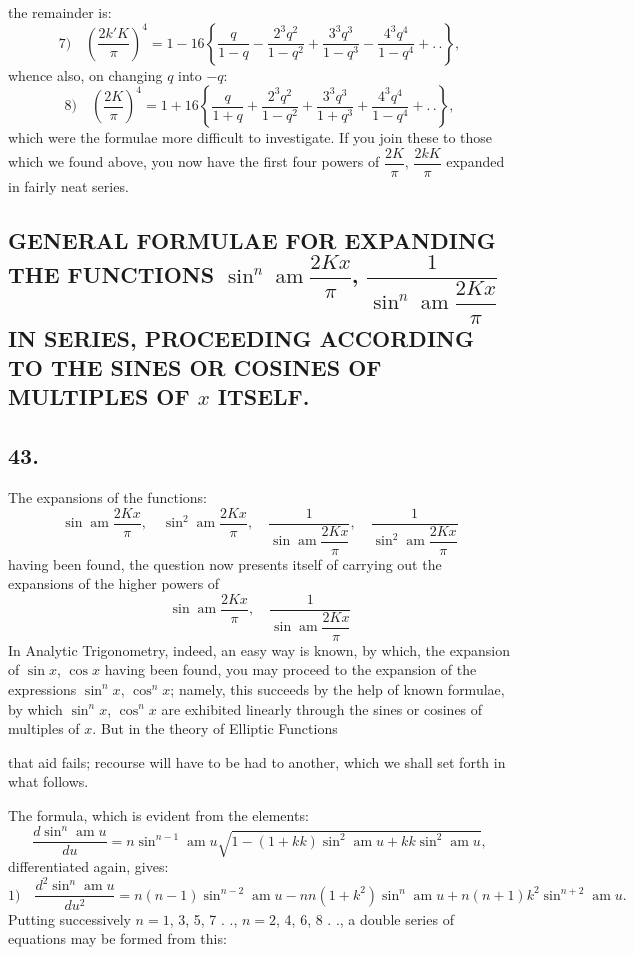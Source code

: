 \documentclass{article}
\begin{document}
the remainder is:
\[
\text{7)}\quad\left(\frac{2k'K}{\pi}\right)^{4}=1-16\left\{\frac{q}{1-q}-\frac{2^{3}q^{2}}{1-q^{2}}+\frac{3^{3}q^{3}}{1-q^{3}}-\frac{4^{3}q^{4}}{1-q^{4}}+.\,.\right\},
\]
whence also, on changing $q$ into $-q$:
\[
\text{8)}\quad\left(\frac{2K}{\pi}\right)^{4}=1+16\left\{\frac{q}{1+q}+\frac{2^{3}q^{2}}{1-q^{2}}+\frac{3^{3}q^{3}}{1+q^{3}}+\frac{4^{3}q^{4}}{1-q^{4}}+.\,.\right\},
\]
which were the formulae more difficult to investigate. If you join these to those which we found above, you now have the first four powers of $\dfrac{2K}{\pi}$, $\dfrac{2kK}{\pi}$ expanded in fairly neat series.

\subsection*{GENERAL FORMULAE FOR EXPANDING THE FUNCTIONS $\sin^{n}\operatorname{am}\dfrac{2Kx}{\pi}$, $\dfrac{1}{\sin^{n}\operatorname{am}\dfrac{2Kx}{\pi}}$ IN SERIES, PROCEEDING ACCORDING TO THE SINES OR COSINES OF MULTIPLES OF $x$ ITSELF.}

\subsection*{43.}

The expansions of the functions:
\[
\sin\operatorname{am}\frac{2Kx}{\pi},\quad\sin^{2}\operatorname{am}\frac{2Kx}{\pi},\quad\frac{1}{\sin\operatorname{am}\dfrac{2Kx}{\pi}},\quad\frac{1}{\sin^{2}\operatorname{am}\dfrac{2Kx}{\pi}}
\]
having been found, the question now presents itself of carrying out the expansions of the higher powers of
\[
\sin\operatorname{am}\frac{2Kx}{\pi},\quad\frac{1}{\sin\operatorname{am}\dfrac{2Kx}{\pi}}
\]
In Analytic Trigonometry, indeed, an easy way is known, by which, the expansion of $\sin x$, $\cos x$ having been found, you may proceed to the expansion of the expressions $\sin^{n}x$, $\cos^{n}x$; namely, this succeeds by the help of known formulae, by which $\sin^{n}x$, $\cos^{n}x$ are exhibited linearly through the sines or cosines of multiples of $x$. But in the theory of Elliptic Functions

that aid fails; recourse will have to be had to another, which we shall set forth in what follows.

The formula, which is evident from the elements:
\[
\frac{d\sin^{n}\operatorname{am}u}{du}=n\sin^{n-1}\operatorname{am}u\sqrt{1-(1+kk)\sin^{2}\operatorname{am}u+kk\sin^{2}\operatorname{am}u},
\]
differentiated again, gives:
\[
\text{1)}\quad\frac{d^{2}\sin^{n}\operatorname{am}u}{du^{2}}=n(n-1)\sin^{n-2}\operatorname{am}u-nn(1+k^{2})\sin^{n}\operatorname{am}u+n(n+1)k^{2}\sin^{n+2}\operatorname{am}u.
\]
Putting successively $n=1$, 3, 5, 7 . ., $n=2$, 4, 6, 8 . ., a double series of equations may be formed from this:
\end{document}
